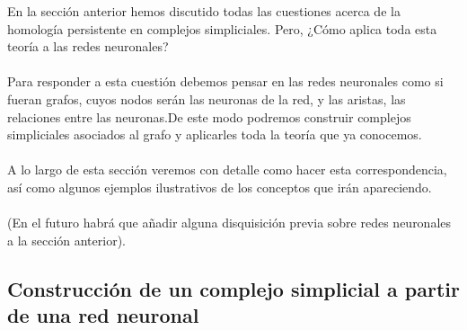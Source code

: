 \documentclass[12pt]{article}
\numberwithin{equation}{section}
\theoremstyle{definition}
\theoremstyle{remark}
\theoremstyle{plain}
\begin{document}
		En la sección anterior hemos discutido todas las cuestiones 
		acerca de la homología persistente en complejos simpliciales. 
		Pero, ¿Cómo aplica toda esta teoría a las redes neuronales? \\
		\\
		Para responder a esta cuestión debemos pensar en las redes 
		neuronales como si fueran grafos, cuyos nodos serán las neuronas 
		de la red, y las aristas, las relaciones entre las neuronas.De 
		este modo podremos construir complejos simpliciales asociados 
		al grafo y aplicarles toda la teoría que ya conocemos. \\
		\\
		A lo largo de esta sección veremos con detalle como hacer esta 
		correspondencia, así como algunos ejemplos ilustrativos de los 
		conceptos que irán apareciendo.\\
		\\
		(En el futuro habrá que añadir alguna disquisición previa sobre redes neuronales a la sección anterior).

	\subsection{Construcción de un complejo simplicial a partir de una red neuronal}
\end{document}
